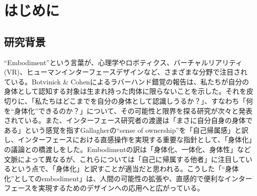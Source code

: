 \chapter{はじめに}
\label{introduction}

\section{研究背景}
\label{subject}
``Embodiment''という言葉が、心理学やロボティクス、バーチャルリアリティ(VR)、ヒューマンインターフェースデザインなど、さまざまな分野で注目されている。Botvinick \& Cohenによるラバーハンド錯覚\cite{BotvinickCohen1998}の報告は、私たちが自分の身体として認知する対象は生まれ持った肉体に限らないことを示した。それを皮切りに、「私たちはどこまでを自分の身体として認識しうるか？」、すなわち「何を``身体化''できるのか？」について、その可能性と限界を探る研究が次々と発表されている。また、インターフェース研究者の渡邊は「まさに自分自身の身体である」という感覚を指すGallagher\cite{Gallagher2000}の``sense of ownership''を「自己帰属感」と訳し\cite{Watanabe2013}、インターフェースにおける直感操作を実現する重要な指針として、「身体化」の議論との橋渡しをした。Embodimentの訳は「身体化、一体化、身体性」など文脈によって異なるが、これらについては「自己に帰属する他者」に注目しているという点で、「身体化」と訳すことが適当だと思われる。こうした「``身体化''としてのembodiment」は、人間の可能性の拡張や、直感的で便利なインターフェースを実現するためのデザインへの応用へと広がっている。





